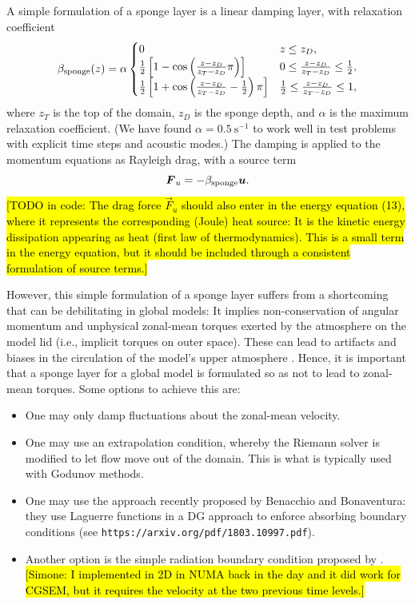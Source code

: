 \documentclass{article}
\begin{document}
A simple formulation of a sponge layer is a linear damping layer, with relaxation coefficient \citep{durran:1983}
\begin{equation}\label{eq:spongeDurran}
\beta_{\rm sponge}(z) = \alpha
    \begin{cases}
    0 &  z\leq z_D,\\
    \frac{1}{2}\left[1 - \cos\left(\frac{z - z_D}{z_T - z_D}\pi\right) \right] &  0\leq \frac{z - z_D}{z_T - z_D} \leq \frac{1}{2},\\
    \frac{1}{2}\left[1 + \cos\left(\frac{z - z_D}{z_T - z_D} - \frac{1}{2}\right)\pi \right]  &  \frac{1}{2}\leq \frac{z - z_D}{z_T - z_D} \leq 1,\\
    \end{cases}
\end{equation}
where $z_T$ is the top of the domain, $z_D$ is the sponge depth, and $\alpha$ is the maximum relaxation coefficient. (We have found $\alpha = 0.5~\mathrm{s^{-1}}$ to work well in test problems with explicit time steps and acoustic modes.) The damping is applied to the momentum equations as Rayleigh drag, with a source term
\begin{equation*}
\vec{F}_u = -\beta_{\rm sponge} \vec{u}.
\end{equation*}
\hl{[TODO in code: The drag force $\vec{F}_u$ should also enter in the energy equation (13), where it represents the corresponding (Joule) heat source: It is the kinetic energy dissipation appearing as heat (first law of thermodynamics). This is a small term in the energy equation, but it should be included through a consistent formulation of source terms.]} 

However, this simple formulation of a sponge layer suffers from a shortcoming that can be debilitating in global models: It implies non-conservation of angular momentum and unphysical zonal-mean torques exerted by the atmosphere on the model lid (i.e., implicit torques on outer space). These can lead to artifacts and biases in the circulation of the model's upper atmosphere \citep[e.g.,][]{Shepherd96a}. Hence, it is important that a sponge layer for a global model is formulated so as not to lead to zonal-mean torques. Some options to achieve this are:
\begin{itemize}
    \item One may only damp fluctuations about the zonal-mean velocity.  
    \item One may use an extrapolation condition, whereby the Riemann solver is modified to let flow move out of the domain. This is what is typically used with Godunov methods. 
    \item One may use the approach recently proposed by Benacchio and Bonaventura: they use Laguerre functions in a DG approach to enforce absorbing boundary conditions (see \texttt{https://arxiv.org/pdf/1803.10997.pdf}).
    \item Another option is the simple radiation boundary condition proposed by \cite{orlanski1979}. \hl{[Simone: I implemented in 2D in NUMA back in the day and it did work for CGSEM, but it requires the velocity at the two previous time levels.]}
\end{itemize}
    
\end{document}

